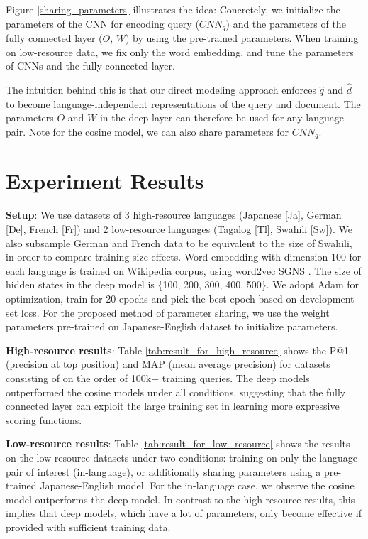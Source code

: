 \documentclass[11pt,a4paper]{article}
\begin{document}
Figure \ref{sharing_parameters} illustrates the idea: 
Concretely, we initialize the parameters of the CNN for encoding query ($CNN_q$) and the parameters of the fully connected layer ($O$, $W$) by using the pre-trained parameters. 
When training on low-resource data, we fix only the word embedding, and tune the parameters of CNNs and the fully connected layer.

The intuition behind this is that our direct modeling approach enforces $\hat{q}$ and $\hat{d}$ to become language-independent representations of the query and document. The parameters $O$ and $W$ in the deep layer can therefore be used for any language-pair. Note for the cosine model, we can also share parameters for $CNN_q$.



\section{Experiment Results}
\label{sec:experiment}

\textbf{Setup}: We use datasets of 3 high-resource languages (Japanese [Ja], German [De], French [Fr]) and 2 low-resource languages (Tagalog [Tl], Swahili [Sw]).  We also subsample German and French data to be equivalent to the size of Swahili, in order to compare training size effects.
Word embedding with dimension 100 for each language is trained on Wikipedia corpus, using word2vec SGNS \cite{mikolov14distributed}.
The size of hidden states in the deep model is \{100, 200, 300, 400, 500\}. We adopt Adam \cite{kingma14adam} for optimization, train for 20 epochs and pick the best epoch based on development set loss.
For the proposed method of parameter sharing, we use the weight parameters pre-trained on Japanese-English dataset to initialize parameters. 

\noindent \textbf{High-resource results}: Table \ref{tab:result_for_high_resource} shows the P@1 (precision at top position) and MAP (mean average precision) for datasets consisting of on the order of 100k+ training queries.
The deep models outperformed the cosine models under all conditions, suggesting that the fully connected layer can exploit the large training set in learning more expressive scoring functions. 

\noindent \textbf{Low-resource results}: Table \ref{tab:result_for_low_resource} shows the results on the low resource datasets under two conditions: training on only the language-pair of interest (in-language), or additionally sharing parameters using a pre-trained Japanese-English model. 
For the in-language case, we observe the cosine model outperforms the deep model. 
In contrast to the high-resource results, this implies that deep models, which have a lot of parameters, only become effective if provided with sufficient training data. 
\end{document}
